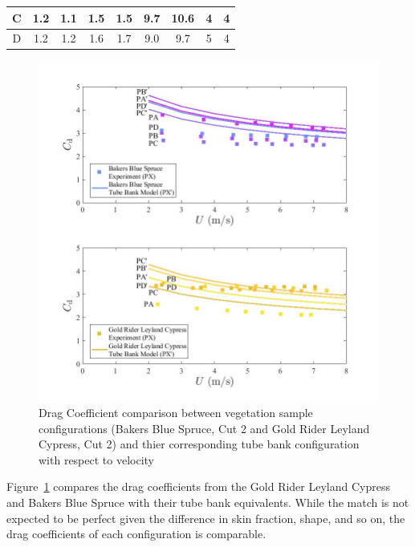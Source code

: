 \documentclass[12pt]{article}
\begin{document}
\begin{table}[!]
\begin{tabular}{|c|c|c|c|c|c|c|c|c|}
    C                            & 1.2            & 1.1     & 1.5                  & 1.5                & 9.7               & 10.6       & 4                           & 4                                \\ \hline
    D                            & 1.2            & 1.2      & 1.6                  & 1.7                & 9.0               & 9.7        & 5                           & 4                                \\ \hline
    \end{tabular}
\end{table}

\begin{figure}[!]
	\centering 	
\includegraphics[width=1\linewidth]{Picture13.jpg}
	\caption[Drag Coefficient comparison between vegetation samples and tube bank configurations]{Drag Coefficient comparison between vegetation sample configurations (Bakers Blue Spruce, Cut 2 and Gold Rider Leyland Cypress, Cut 2) and thier corresponding tube bank configuration with respect to velocity}
	\label{fig:TBGR}
\end{figure}

Figure~\ref{fig:TBGR} compares the drag coefficients from the Gold Rider Leyland Cypress and Bakers Blue Spruce with their tube bank equivalents. While the match is not expected to be perfect given the difference in skin fraction, shape, and so on, the drag coefficients of each configuration is comparable.
\pagebreak
\end{document}
